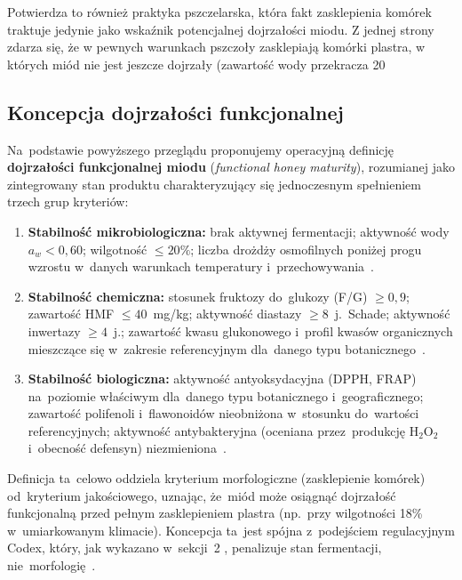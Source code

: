 Potwierdza to również praktyka pszczelarska, która fakt zasklepienia komórek traktuje jedynie jako wskaźnik potencjalnej dojrzałości miodu. Z jednej strony zdarza się, że w pewnych warunkach pszczoły zasklepiają komórki plastra, w których miód nie jest jeszcze dojrzały (zawartość wody przekracza 20%

\subsection{Koncepcja dojrzałości funkcjonalnej}
Na~podstawie powyższego przeglądu proponujemy operacyjną definicję
\textbf{dojrzałości funkcjonalnej miodu} (\textit{functional honey
maturity}), rozumianej jako zintegrowany stan produktu charakteryzujący
się jednoczesnym spełnieniem trzech grup kryteriów:

\begin{enumerate}
    \item \textbf{Stabilność mikrobiologiczna:} brak aktywnej
          fermentacji; aktywność wody $a_w < 0{,}60$; wilgotność
          $\leq 20\%$; liczba drożdży osmofilnych poniżej progu
          wzrostu w~danych warunkach temperatury
          i~przechowywania~\cite{zamora2006}.

    \item \textbf{Stabilność chemiczna:} stosunek fruktozy do~glukozy
          (F/G) $\geq 0{,}9$; zawartość HMF $\leq 40$~mg/kg;
          aktywność diastazy $\geq 8$~j.~Schade; aktywność inwertazy
          $\geq 4$~j.; zawartość kwasu glukonowego i~profil kwasów
          organicznych mieszczące się w~zakresie referencyjnym
          dla~danego typu botanicznego~\cite{codex_stan12,zhang2021}.

    \item \textbf{Stabilność biologiczna:} aktywność antyoksydacyjna
          (DPPH, FRAP) na~poziomie właściwym dla~danego typu
          botanicznego i~geograficznego; zawartość polifenoli i~flawonoidów
          nieobniżona w~stosunku do~wartości referencyjnych;
          aktywność antybakteryjna (oceniana przez~produkcję
          H$_2$O$_2$ i~obecność defensyn) niezmieniona~\cite{guo2020}.
\end{enumerate}

Definicja ta~celowo oddziela kryterium morfologiczne (zasklepienie
komórek) od~kryterium jakościowego, uznając, że~miód może osiągnąć
dojrzałość funkcjonalną przed pełnym zasklepieniem plastra (np.~przy
wilgotności 18\% w~umiarkowanym klimacie). Koncepcja ta~jest spójna
z~podejściem regulacyjnym Codex, który, jak wykazano w~sekcji~2 , penalizuje stan fermentacji, nie~morfologię~\cite{codex_stan12,sun2021}.
